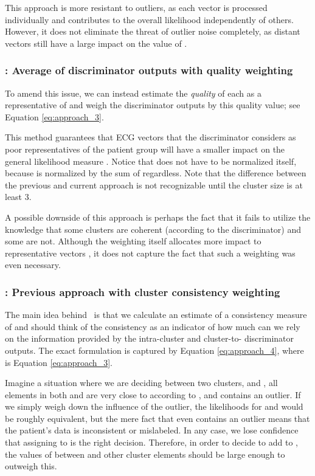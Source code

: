 \documentclass[preprint,12pt]{elsarticle}
\begin{document}
This approach is more resistant to outliers, as each vector is processed individually and contributes to the overall likelihood independently of others. However, it does not eliminate the threat of outlier noise completely, as distant vectors still have a large impact on the value of . 

\subsubsection{\aC: Average of discriminator outputs with quality weighting}

To amend this issue, we can instead estimate the \textit{quality} of each  as a representative of  and weigh the discriminator outputs by this quality value; see Equation \ref{eq:approach_3}. 



This method guarantees that ECG vectors that the discriminator considers as poor representatives of the patient group  will have a smaller impact on the general likelihood measure . Notice that  does not have to be normalized itself, because  is normalized by the sum of  regardless. Note that the difference between the previous and current approach is not recognizable until the cluster size is at least 3.

A possible downside of this approach is perhaps the fact that it fails to utilize the knowledge that some clusters are coherent (according to the discriminator) and some are not. Although the weighting itself allocates more impact to representative vectors , it does not capture the fact that such a weighting was even necessary.

\subsubsection{\aD: Previous approach with cluster consistency weighting}

The main idea behind \aD\ is that we calculate an estimate of a consistency measure  of  and should think of the consistency as an indicator of how much can we rely on the information provided by the intra-cluster and cluster-to- discriminator outputs. The exact formulation is captured by Equation \ref{eq:approach_4}, where  is Equation \ref{eq:approach_3}.



Imagine a situation where we are deciding between two clusters,  and , all elements in both  and  are very close to  according to , and  contains an outlier. If we simply weigh down the influence of the outlier, the likelihoods for  and  would be roughly equivalent, but the mere fact that  even contains an outlier means that the patient's data is inconsistent or mislabeled. In any case, we lose confidence that assigning  to  is the right decision. Therefore, in order to decide to add  to , the values of  between  and other cluster elements should be large enough to outweigh this.
\end{document}
